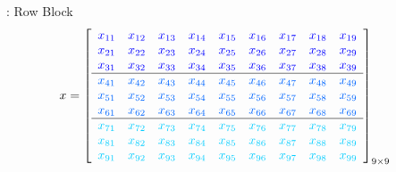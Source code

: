 \begin{frame}
  \begin{exampleblock}{:  Row Block}
    \begin{align*}
      x &= \left[
          \begin{array}{lllllllll}
            \color{g11}x_{11} & \color{g11}x_{12} & \color{g11}x_{13} & 
\color{g11}x_{14} & \color{g11}x_{15} & \color{g11}x_{16} & \color{g11}x_{17} & 
\color{g11}x_{18} & \color{g11}x_{19}\\
      \color{g11}x_{21} & \color{g11}x_{22} & \color{g11}x_{23} & 
\color{g11}x_{24} & \color{g11}x_{25} & \color{g11}x_{26} & \color{g11}x_{27} & 
\color{g11}x_{28} & \color{g11}x_{29}\\
      \color{g11}x_{31} & \color{g11}x_{32} & \color{g11}x_{33} & 
\color{g11}x_{34} & \color{g11}x_{35} & \color{g11}x_{36} & \color{g11}x_{37} & 
\color{g11}x_{38} & \color{g11}x_{39}\\\hline
      \color{g12}x_{41} & \color{g12}x_{42} & \color{g12}x_{43} & 
\color{g12}x_{44} & \color{g12}x_{45} & \color{g12}x_{46} & \color{g12}x_{47} & 
\color{g12}x_{48} & \color{g12}x_{49}\\
      \color{g12}x_{51} & \color{g12}x_{52} & \color{g12}x_{53} & 
\color{g12}x_{54} & \color{g12}x_{55} & \color{g12}x_{56} & \color{g12}x_{57} & 
\color{g12}x_{58} & \color{g12}x_{59}\\
      \color{g12}x_{61} & \color{g12}x_{62} & \color{g12}x_{63} & 
\color{g12}x_{64} & \color{g12}x_{65} & \color{g12}x_{66} & \color{g12}x_{67} & 
\color{g12}x_{68} & \color{g12}x_{69}\\\hline
      \color{g13}x_{71} & \color{g13}x_{72} & \color{g13}x_{73} & 
\color{g13}x_{74} & \color{g13}x_{75} & \color{g13}x_{76} & \color{g13}x_{77} & 
\color{g13}x_{78} & \color{g13}x_{79}\\
      \color{g13}x_{81} & \color{g13}x_{82} & \color{g13}x_{83} & 
\color{g13}x_{84} & \color{g13}x_{85} & \color{g13}x_{86} & \color{g13}x_{87} & 
\color{g13}x_{88} & \color{g13}x_{89}\\
      \color{g13}x_{91} & \color{g13}x_{92} & \color{g13}x_{93} & 
\color{g13}x_{94} & \color{g13}x_{95} & \color{g13}x_{96} & \color{g13}x_{97} & 
\color{g13}x_{98} & \color{g13}x_{99}\\
          \end{array}
      \right]_{9\times 9}
    \end{align*}
    \vspace{-.6cm}
    \begin{align*}

\end{align*}
\end{exampleblock}
\end{frame}
